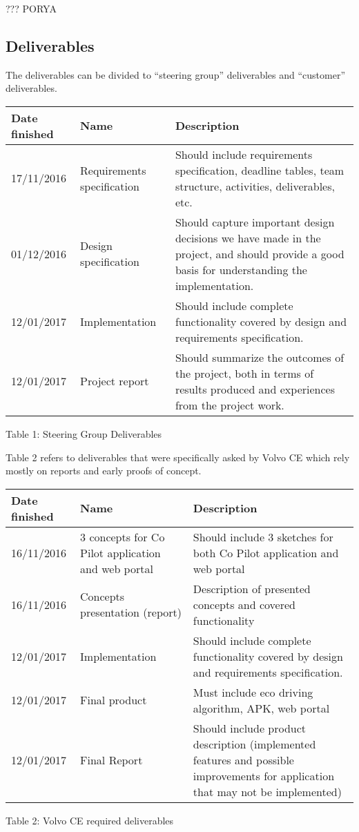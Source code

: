 \documentclass{article}
\begin{document}
??? PORYA

\subsection{Deliverables}

The deliverables can be divided to “steering group” deliverables and “customer” deliverables. 

\begin{center}
\begin{tabular}{|l|l|p{8.5cm}|}
\hline
\textbf{Date finished} & \textbf{Name} & \textbf{Description} \\ \hline
17/11/2016 & Requirements specification & Should include requirements specification, deadline tables, team structure, activities, deliverables, etc. \\ \hline
01/12/2016 & Design specification & Should capture important design decisions we have made in the project, and should provide a good basis for understanding the implementation. \\ \hline
12/01/2017 & Implementation & Should include complete functionality covered by design and requirements specification. \\ \hline
12/01/2017 & Project report & Should summarize the outcomes of the project, both in terms of results produced and experiences from the project work. \\ \hline
\end{tabular}
\end{center}
\begin{center}
\caption{Table 1: Steering Group Deliverables}
\end{center}

Table 2 refers to deliverables that were specifically asked by Volvo CE which rely mostly on reports and early proofs of concept. 

\begin{center}
\begin{tabular}{|l|p{4.25cm}|p{8.5cm}|}
\hline
\textbf{Date finished} & \textbf{Name} & \textbf{Description} \\ \hline
16/11/2016 & 3 concepts for Co Pilot application and web portal
 & Should include 3 sketches for both Co Pilot application and web portal \\ \hline
16/11/2016 & Concepts presentation (report) & Description of presented concepts and covered functionality \\ \hline
12/01/2017 & Implementation & Should include complete functionality covered by design and requirements specification. \\ \hline
12/01/2017 & Final product & Must include eco driving algorithm, APK, web portal \\ \hline
12/01/2017 & Final Report & Should include product description (implemented features and possible improvements for application that may not be implemented) \\ \hline
\end{tabular}
\end{center}
\begin{center}
\caption{Table 2: Volvo CE required deliverables}
\end{center}
\end{document}
